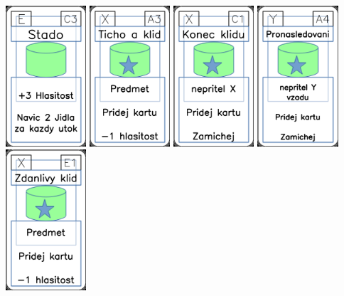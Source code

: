 \documentclass[a4paper]{article}
\begin{document}
	\includegraphics[width=3.0cm]{img-4_42}
	\includegraphics[width=3.0cm]{img-5_2}
	\includegraphics[width=3.0cm]{img-5_10}
	\includegraphics[width=3.0cm]{img-5_33}
	\includegraphics[width=3.0cm]{img-5_20}
\end{document}
